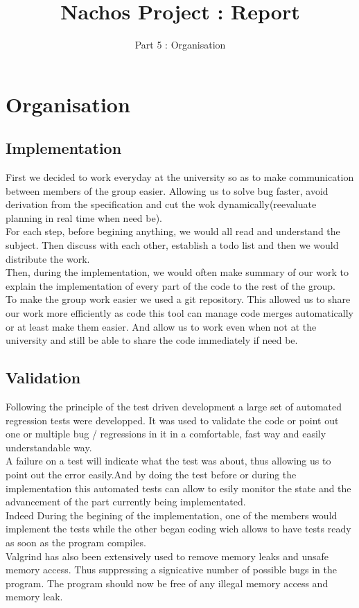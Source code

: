 \documentclass[a4paper,10pt]{article}
\title{Nachos Project : Report}
\subtitle{Part 5 : Organisation}
\begin{document}

\section{Organisation}

\subsection{Implementation}

First we decided to work everyday at the university so as to make communication between members of the group easier.
Allowing us to solve bug faster, avoid derivation from the specification and cut the wok dynamically(reevaluate 
planning in real time when need be).\\
For each step, before begining anything, we would all read and understand the subject. Then discuss with each other,
establish a todo list and then we would distribute the work. \\ 
Then, during the implementation, we would often make summary of our work to explain the implementation of every part 
of the code to the rest of the group.\\
To make the group work easier we used a git repository. This allowed us to share our work more efficiently as code
this tool can manage code merges automatically or at least make them easier. And allow us to work even when not
at the university and still be able to share the code immediately if need be.\\

\subsection{Validation}
Following the principle of the test driven development a large set of automated regression tests were developped. 
It was used to validate the code or point out one or multiple bug / regressions in it in a comfortable, fast
way and easily understandable way. \\
A failure on a test will indicate what the test was about, thus allowing us to point out the error easily.And by 
doing the test before or during the implementation this automated tests can allow to esily monitor the state and the
advancement of the part currently being implementated.\\ Indeed During the begining of the  implementation, one of 
the members would implement the tests while the other began coding wich allows to have tests ready as soon as the 
program compiles. \\
Valgrind has also been extensively used to remove memory leaks and unsafe memory access. Thus suppressing a 
signicative number of possible bugs in the program. The program should now be free of any illegal memory access
and memory leak.
\end{document}
